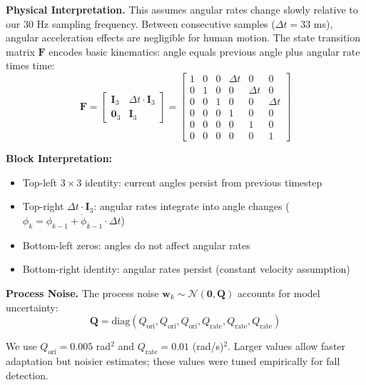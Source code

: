 \textbf{Physical Interpretation.} This assumes angular rates change slowly relative to our 30 Hz sampling frequency. Between consecutive samples ($\Delta t = 33$ ms), angular acceleration effects are negligible for human motion. The state transition matrix $\mathbf{F}$ encodes basic kinematics: angle equals previous angle plus angular rate times time:
\begin{equation}
\mathbf{F} = \begin{bmatrix}
\mathbf{I}_3 & \Delta t \cdot \mathbf{I}_3 \\[2pt]
\mathbf{0}_3 & \mathbf{I}_3
\end{bmatrix} =
\begin{bmatrix}
1 & 0 & 0 & \Delta t & 0 & 0 \\
0 & 1 & 0 & 0 & \Delta t & 0 \\
0 & 0 & 1 & 0 & 0 & \Delta t \\
0 & 0 & 0 & 1 & 0 & 0 \\
0 & 0 & 0 & 0 & 1 & 0 \\
0 & 0 & 0 & 0 & 0 & 1
\end{bmatrix}
\label{eq:F_matrix}
\end{equation}

\textbf{Block Interpretation:}
\begin{itemize}
\item Top-left $3 \times 3$ identity: current angles persist from previous timestep
\item Top-right $\Delta t \cdot \mathbf{I}_3$: angular rates integrate into angle changes ($\phi_k = \phi_{k-1} + \dot{\phi}_{k-1} \cdot \Delta t$)
\item Bottom-left zeros: angles do not affect angular rates
\item Bottom-right identity: angular rates persist (constant velocity assumption)
\end{itemize}

\textbf{Process Noise.} The process noise $\mathbf{w}_k \sim \mathcal{N}(\mathbf{0}, \mathbf{Q})$ accounts for model uncertainty:
\begin{equation}
\mathbf{Q} = \text{diag}(Q_{\text{ori}}, Q_{\text{ori}}, Q_{\text{ori}}, Q_{\text{rate}}, Q_{\text{rate}}, Q_{\text{rate}})
\label{eq:Q_matrix}
\end{equation}

We use $Q_{\text{ori}} = 0.005$ rad$^2$ and $Q_{\text{rate}} = 0.01$ (rad/s)$^2$. Larger values allow faster adaptation but noisier estimates; these values were tuned empirically for fall detection.

